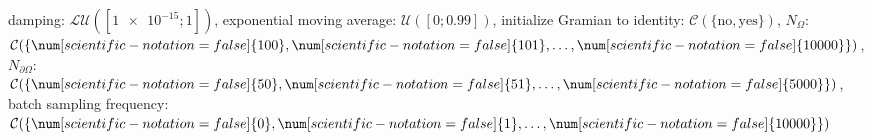 damping: $\mathcal{LU}([\num[scientific-notation=true]{1e-15}; \num[scientific-notation=false]{1}])$, exponential moving average: $\mathcal{U}([\num[scientific-notation=false]{0}; \num[scientific-notation=true]{0.99}])$, initialize Gramian to identity: $\mathcal{C}(\{\text{no},\text{yes}\})$, $N_{\Omega}$: $\mathcal{C}(\{\num[scientific-notation=false]{100},\num[scientific-notation=false]{101},\text{\dots},\num[scientific-notation=false]{10000}\})$, $N_{\partial\Omega}$: $\mathcal{C}(\{\num[scientific-notation=false]{50},\num[scientific-notation=false]{51},\text{\dots},\num[scientific-notation=false]{5000}\})$, batch sampling frequency: $\mathcal{C}(\{\num[scientific-notation=false]{0},\num[scientific-notation=false]{1},\text{\dots},\num[scientific-notation=false]{10000}\})$